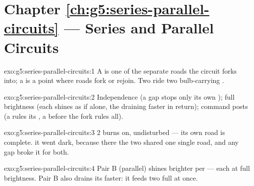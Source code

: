 \section*{Chapter \ref{ch:g5:series-parallel-circuits} --- Series and Parallel Circuits}

\begin{solution}{exo:g5:series-parallel-circuits:1}
A  is one of the separate roads the circuit forks into; a
 is a point where roads fork or rejoin. Two   ride two bulb-carrying .
\end{solution}

\begin{solution}{exo:g5:series-parallel-circuits:2}
Independence (a gap stops only its own ); full brightness
(each  shines as if alone, the  draining faster in
return); command posts (a   rules its , a 
before the fork rules all).
\end{solution}

\begin{solution}{exo:g5:series-parallel-circuits:3}
 2 burns on, undisturbed --- its own road is complete.  it went dark, because there the two  shared one single
road, and any gap broke it for both.
\end{solution}

\begin{solution}{exo:g5:series-parallel-circuits:4}
Pair B (parallel) shines brighter per  --- each at full
brightness. Pair B also drains its  faster: it feeds two
full  at once.
\end{solution}

